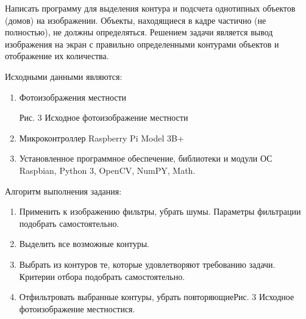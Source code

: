 
Написать программу для выделения контура и подсчета однотипных объектов (домов) на изображении. Объекты, находящиеся в кадре частично (не полностью), не должны определяться. Решением задачи является вывод изображения на экран с правильно определенными контурами объектов и отображение их количества. 

\solutionSection

Исходными данными являются:

\begin{enumerate}
    \item Фотоизображения местности
          \begin{center}
            Рис. 3 Исходное фотоизображение местности
          \end{center} 
    \item Микроконтроллер Raspberry Pi Model 3B+ 
    \item Установленное программное обеспечение, библиотеки и модули ОС Raspbian, Python 3, OpenCV, NumPY, Math.
    
\end{enumerate}
Алгоритм выполнения задания:
\begin{enumerate}
    \item Применить к изображению фильтры, убрать шумы. Параметры фильтрации подобрать самостоятельно.
    \item Выделить все возможные контуры.
    \item Выбрать из контуров те, которые удовлетворяют требованию задачи. Критерии отбора подобрать самостоятельно.
    \item Отфильтровать выбранные контуры, убрать повторяющиеРис. 3 Исходное фотоизображение местностися.
\end{enumerate}
